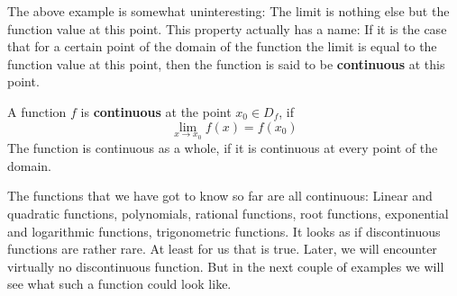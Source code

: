 \documentclass[12pt,eng]{skript_ogg}
\begin{document}
The above example is somewhat uninteresting: The limit is nothing else but the function value at this point. This property actually has a name: If it is the case that for a certain point of the domain of the function the limit is equal to the function value at this point, then the function is said to be \textbf{continuous} at this point.
\begin{defn}[Continuity]
A function $f$ is \textbf{continuous} at the point $x_0\in D_f$, if
\[\lim_{x\rightarrow x_0}f(x)=f(x_0)\]
The function is continuous as a whole, if it is continuous at every point of the domain.
\end{defn}

The functions that we have got to know so far are all continuous: Linear and quadratic functions, polynomials, rational functions, root functions, exponential and logarithmic functions, trigonometric functions. It looks as if discontinuous functions are rather rare. At least for us that is true. Later, we will encounter virtually no discontinuous function. But in the next couple of examples we will see what such a function could look like.
\end{document}
